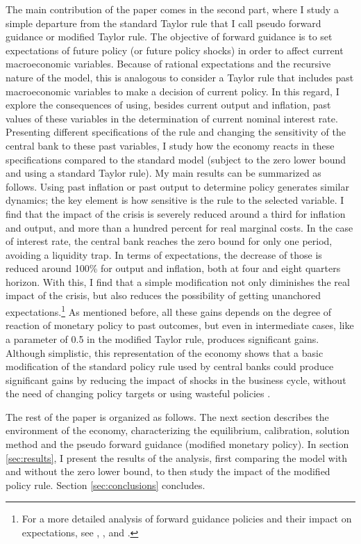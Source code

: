 \documentclass[12pt]{article}
\numberwithin{equation}{section}
\begin{document}
The main contribution of the paper comes in the second part, where I study a simple departure from the standard Taylor rule that I call pseudo forward guidance or modified Taylor rule. The objective of forward guidance is to set expectations of future policy (or future policy shocks) in order to affect current macroeconomic variables. Because of rational expectations and the recursive nature of the model, this is analogous to consider a Taylor rule that includes past macroeconomic variables to make a decision of current policy. In this regard, I explore the consequences of using, besides current output and inflation, past values of these variables in the determination of current nominal interest rate. Presenting different specifications of the rule and changing the sensitivity of the central bank to these past variables, I study how the economy reacts in these specifications compared to the standard model (subject to the zero lower bound and using a standard Taylor rule). My main results can be summarized as follows. Using past inflation or past output to determine policy generates similar dynamics; the key element is how sensitive is the rule to the selected variable. I find that the impact of the crisis is severely reduced around a third for inflation and output, and more than a hundred percent for real marginal costs. In the case of interest rate, the central bank reaches the zero bound for only one period, avoiding a liquidity trap. In terms of expectations, the decrease of those is reduced around 100\% for output and inflation, both at four and eight quarters horizon. With this, I find that a simple modification not only diminishes the real impact of the crisis, but also reduces the possibility of getting unanchored expectations.\footnote{For a more detailed analysis of forward guidance policies and their impact on expectations, see \cite{CampbellEtAl2012}, \cite{AndradeEtAl2015}, \cite{BachmannEtAl2015} and \cite{AngeletosEtAl2016}.} As mentioned before, all these gains depends on the degree of reaction of monetary policy to past outcomes, but even in intermediate cases, like a parameter of 0.5 in the modified Taylor rule, produces significant gains. Although simplistic, this representation of the economy shows that a basic modification of the standard policy rule used by central banks could produce significant gains by reducing the impact of shocks in the business cycle, without the need of changing policy targets \citep{CoibionEtAl2012} or using wasteful policies \citep{CorreiaEtAl2013}.

The rest of the paper is organized as follows. The next section describes the environment of the economy, characterizing the equilibrium, calibration, solution method and the pseudo forward guidance (modified monetary policy). In section \ref{sec:results}, I present the results of the analysis, first comparing the model with and without the zero lower bound, to then study the impact of the modified policy rule. Section \ref{sec:conclusions} concludes.
\end{document}
